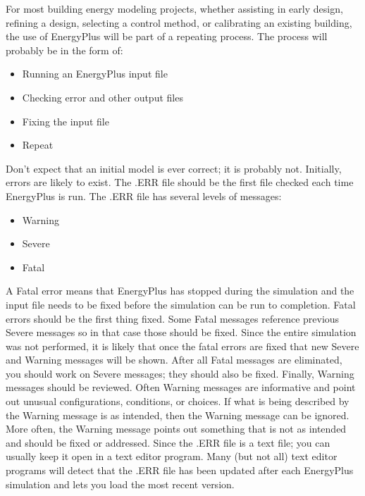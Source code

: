 For most building energy modeling projects, whether assisting in early
design, refining a design, selecting a control method, or calibrating
an existing building, the use of EnergyPlus will be part of a repeating
process. The process will probably be in the form of:
\begin{itemize}
\item Running an EnergyPlus input file
\item Checking error and other output files
\item Fixing the input file
\item Repeat
\end{itemize}
Don't expect that an initial model is ever correct; it is probably
not. Initially, errors are likely to exist. The .ERR file should be
the first file checked each time EnergyPlus is run. The .ERR file
has several levels of messages: 
\begin{itemize}
\item Warning
\item Severe
\item Fatal 
\end{itemize}
A Fatal error means that EnergyPlus has stopped during the simulation
and the input file needs to be fixed before the simulation can be
run to completion. Fatal errors should be the first thing fixed. Some
Fatal messages reference previous Severe messages so in that case
those should be fixed. Since the entire simulation was not performed,
it is likely that once the fatal errors are fixed that new Severe
and Warning messages will be shown. After all Fatal messages are eliminated,
you should work on Severe messages; they should also be fixed. Finally,
Warning messages should be reviewed. Often Warning messages are informative
and point out unusual configurations, conditions, or choices. If what
is being described by the Warning message is as intended, then the
Warning message can be ignored. More often, the Warning message points
out something that is not as intended and should be fixed or addressed.
Since the .ERR file is a text file; you can usually keep it open in
a text editor program. Many (but not all) text editor programs will
detect that the .ERR file has been updated after each EnergyPlus simulation
and lets you load the most recent version.

